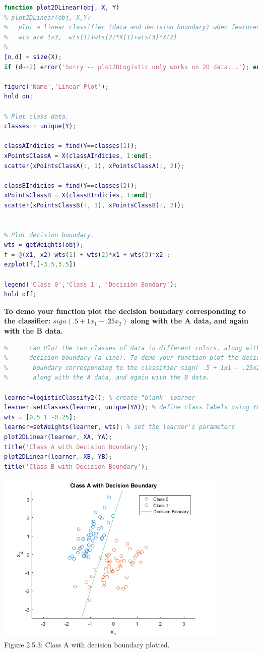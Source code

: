 \documentclass[]{report}   %
\begin{document}
\begin{lstlisting}[language=Matlab, caption=plot2DLinear() Implementation]
function plot2DLinear(obj, X, Y)
% plot2DLinear(obj, X,Y)
%   plot a linear classifier (data and decision boundary) when features X are 2-dim
%   wts are 1x3,  wts(1)+wts(2)*X(1)+wts(3)*X(2)
%
[n,d] = size(X);
if (d~=2) error('Sorry -- plot2DLogistic only works on 2D data...'); end;

figure('Name','Linear Plot');
hold on;

% Plot class data.
classes = unique(Y);

classAIndicies = find(Y==classes(1));
xPointsClassA = X(classAIndicies, 1:end);
scatter(xPointsClassA(:, 1), xPointsClassA(:, 2));

classBIndicies = find(Y==classes(2));
xPointsClassB = X(classBIndicies, 1:end);
scatter(xPointsClassB(:, 1), xPointsClassB(:, 2));


% Plot decision boundary.
wts = getWeights(obj);
f = @(x1, x2) wts(1) + wts(2)*x1 + wts(3)*x2 ;
ezplot(f,[-3.5,3.5])

legend('Class 0','Class 1', 'Decision Bondary');
hold off;
\end{lstlisting}
{\bf To demo your function plot the decision boundary corresponding to the classifier: $sign( .5 + 1x_{1} − .25x_{2} )$ along with the A data, and again with the B data.}
\begin{lstlisting}[language=Matlab, caption=Demoing plot2DLinear()]
%% (B) Write the function @logisticClassify2/plot2DLinear.m such that it 
%      can Plot the two classes of data in different colors, along with the 
%      decision boundary (a line). To demo your function plot the decision 
%       boundary corresponding to the classifier sign( .5 + 1x1 − .25x2 )
%       along with the A data, and again with the B data.

learner=logisticClassify2(); % create "blank" learner
learner=setClasses(learner, unique(YA)); % define class labels using YA or YB
wts = [0.5 1 -0.25]; 
learner=setWeights(learner, wts); % set the learner's parameters
plot2DLinear(learner, XA, YA);
title('Class A with Decision Boundary');
plot2DLinear(learner, XB, YB);
title('Class B with Decision Boundary');
\end{lstlisting}
\begin{center}
	\includegraphics[width=30em,keepaspectratio]{2_5_Figure_3.png}\\
	{Figure 2.5.3: Class A with decision boundary plotted.}
\end{center} 
\end{document}
